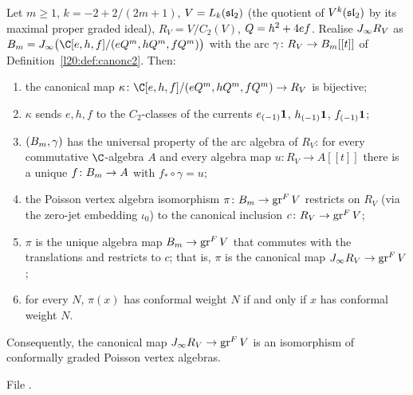 \begin{theorem}\label{l20:thm:ad11}
Let $m\ge1$, $k=-2+2/(2m+1)$, $V=L_k(\mathfrak{sl}_2)$ (the quotient of $V^k(\mathfrak{sl}_2)$ by its maximal proper graded ideal),
$R_V=V/C_2(V)$, $Q=h^2+4ef$. Realise $J_\infty R_V$ as $\ltwentyB=\ltwentyJ\bigl(\C[e,h,f]/(e\ltwentyQ^m,h\ltwentyQ^m,
f\ltwentyQ^m)\bigr)$ with the arc $\gamma\colon R_V\to B_m[[t]]$ of Definition~\ref{l20:def:canonc2}. Then:
\begin{enumerate}
\item the canonical map $\kappa\colon\C[e,h,f]/(e\ltwentyQ^m,h\ltwentyQ^m,f\ltwentyQ^m)\to R_V$ is bijective;
\item $\kappa$ sends $e,h,f$ to the $C_2$-classes of the currents $e_{(-1)}\mathbf{1}$, $h_{(-1)}\mathbf{1}$, $f_{(-1)}\mathbf{1}$;
\item $(B_m,\gamma)$ has the universal property of the arc algebra of $R_V$: for every commutative $\C$-algebra $A$ and
  every algebra map $u\colon R_V\to A[[t]]$ there is a unique $f\colon B_m\to A$ with $f_*\circ\gamma=u$;
\item the Poisson vertex algebra isomorphism $\pi\colon B_m\to\operatorname{gr}^F V$ restricts on $R_V$ (via the zero-jet
  embedding $\iota_0$) to the canonical inclusion $c\colon R_V\to\operatorname{gr}^F V$;
\item $\pi$ is the unique algebra map $B_m\to\operatorname{gr}^F V$ that commutes with the translations and restricts to $c$; that is,
  $\pi$ is the canonical map $J_\infty R_V\to\operatorname{gr}^F V$;
\item for every $N$, $\pi(x)$ has conformal weight $N$ if and only if $x$ has conformal weight $N$.
\end{enumerate}
Consequently, the canonical map $J_\infty R_V\to\operatorname{gr}^F V$ is an isomorphism of conformally graded Poisson vertex algebras.
\end{theorem}
\noindent File .
